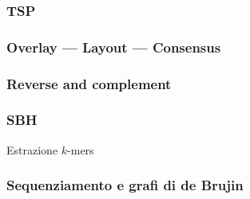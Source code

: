 \begin{frame}[fragile]
\frametitle{TSP}
\end{frame}

\begin{frame}[fragile]
\frametitle{Overlay --- Layout --- Consensus}
\end{frame}

\begin{frame}[fragile]
\frametitle{Reverse and complement}
\end{frame}

\begin{frame}[fragile]
\frametitle{SBH}

Estrazione $k$-mers
\end{frame}


\begin{frame}[fragile]
\frametitle{Sequenziamento e grafi di de Brujin}
\end{frame}


